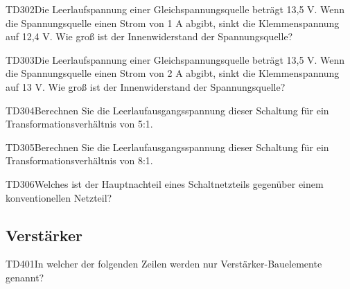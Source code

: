 \begin{question}{TD302}{Die Leerlaufspannung einer Gleichspannungsquelle beträgt 13,5 V. Wenn die Spannungsquelle einen Strom von 1 A abgibt, sinkt die Klemmenspannung auf 12,4 V. Wie groß ist der Innenwiderstand der Spannungsquelle?}
\end{question}

\begin{question}{TD303}{Die Leerlaufspannung einer Gleichspannungsquelle beträgt 13,5 V. Wenn die Spannungsquelle einen Strom von 2 A abgibt, sinkt die Klemmenspannung auf 13 V. Wie groß ist der Innenwiderstand der Spannungsquelle?}
\end{question}

\begin{question}{TD304}{Berechnen Sie die Leerlaufausgangsspannung dieser Schaltung für ein Transformationsverhältnis von 5:1.}
\end{question}

\begin{question}{TD305}{Berechnen Sie die Leerlaufausgangsspannung dieser Schaltung für ein Transformationsverhältnis von 8:1.}
\end{question}

\begin{question}{TD306}{Welches ist der Hauptnachteil eines Schaltnetzteils gegenüber einem konventionellen Netzteil?}
\end{question}

\subsection{Verstärker}

\begin{question}{TD401}{In welcher der folgenden Zeilen werden nur Verstärker-Bauelemente genannt?}
\end{question}

